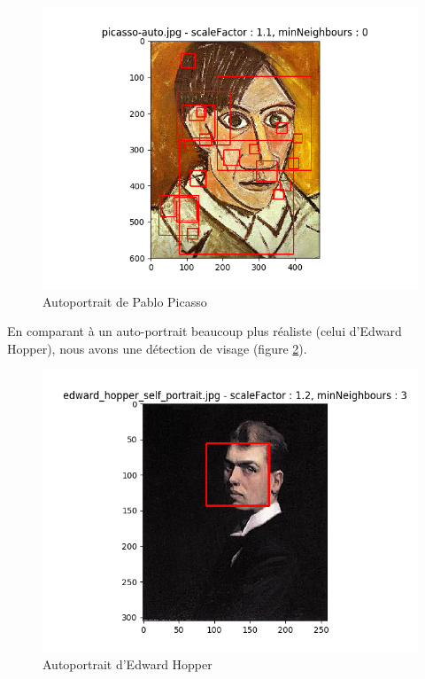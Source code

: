 \documentclass[a4paper,11pt]{article}
\begin{document}

	    \begin{figure}[H]
		\begin{center}
		    \includegraphics[scale = 0.6]{images/picasso-auto_1,1_0.png}
		    \caption{Autoportrait de Pablo Picasso}
		    \label{fig:picasso}
		\end{center}
	    \end{figure}

	En comparant à un auto-portrait beaucoup plus réaliste (celui d'Edward
	Hopper), nous avons une détection de visage (figure \ref{fig:edward}).

	    \begin{figure}[H]
	        \begin{center}
		   \includegraphics[scale = 0.6]{images/edward_hopper_self_portrait_1,2_3.png}
		   \caption{Autoportrait d'Edward Hopper}
		   \label{fig:edward}
	        \end{center}
	    \end{figure}
\end{document}
